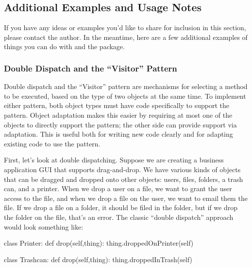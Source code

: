 \begin{verbatim%
}
\begin{verbatim%
}
\begin{verbatim%
}
\begin{verbatim%
}
\begin{verbatim%
}
\begin{verbatim%
}
\begin{verbatim%
}
\begin{verbatim%
}
\begin{verbatim%
}
\begin{verbatim%
}
\begin{verbatim%
}
\begin{verbatim%
}
\subsection{Additional Examples and Usage Notes}

If you have any ideas or examples you'd like to share for inclusion in this
section, please contact the author.  In the meantime, here are a few additional
examples of things you can do with  and the 
package.


\subsubsection{Double Dispatch and the ``Visitor'' Pattern\label{dispatch-example}}

Double dispatch and the ``Visitor'' pattern are mechanisms for selecting a
method to be executed, based on the type of two objects at the same time.
To implement either pattern, both object types must have code specifically to
support the pattern.  Object adaptation makes this easier by requiring at most
one of the objects to directly support the pattern; the other side can provide
support via adaptation.  This is useful both for writing new code clearly and
for adapting existing code to use the pattern.

First, let's look at double dispatching.  Suppose we are creating a business
application GUI that supports drag-and-drop.  We have various kinds of objects
that can be dragged and dropped onto other objects: users, files, folders, a
trash can, and a printer.  When we drop a user on a file, we want to grant the
user access to the file, and when we drop a file on the user, we want to email
them the file.  If we drop a file on a folder, it should be filed in the folder,
but if we drop the folder on the file, that's an error.  The classic ``double
dispatch'' approach would look something like:















\begin{verbatim%
}class Printer:
    def drop(self,thing):
        thing.droppedOnPrinter(self)

class Trashcan:
    def drop(self,thing):
        thing.droppedInTrash(self)


\end{verbatim%
}
\end{verbatim%
}
\end{verbatim%
}
\end{verbatim%
}
\end{verbatim%
}
\end{verbatim%
}
\end{verbatim%
}
\end{verbatim%
}
\end{verbatim%
}
\end{verbatim%
}
\end{verbatim%
}
\end{verbatim%
}
\end{verbatim%
}
